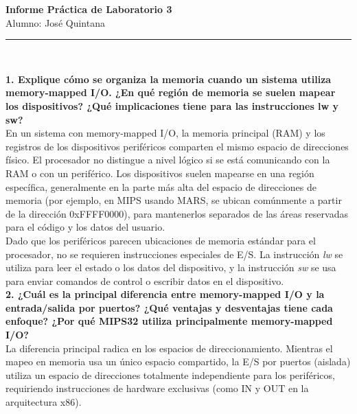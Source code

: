 \documentclass[]{article}
\begin{document}
	
	\begin{center}
		\Large{\textbf{Informe Práctica de Laboratorio 3}} \\
		\footnotesize{Alumno: José Quintana} \\
		\rule{1\linewidth}{0.5pt} \\ %
	\end{center}
	
	{\large \textbf{1. Explique cómo se organiza la memoria cuando un sistema utiliza memory-mapped I/O. ¿En qué región de memoria se suelen mapear los dispositivos? ¿Qué implicaciones tiene para las instrucciones lw y sw?}} \\
	
	En un sistema con memory-mapped I/O, la memoria principal (RAM) y los registros de los dispositivos periféricos comparten el mismo espacio de direcciones físico. El procesador no distingue a nivel lógico si se está comunicando con la RAM o con un periférico. Los dispositivos suelen mapearse en una región específica, generalmente en la parte más alta del espacio de direcciones de memoria (por ejemplo, en MIPS usando MARS, se ubican comúnmente a partir de la dirección 0xFFFF0000), para mantenerlos separados de las áreas reservadas para el código y los datos del usuario. \\
	
	Dado que los periféricos parecen ubicaciones de memoria estándar para el procesador, no se requieren instrucciones especiales de E/S. La instrucción \textit{lw} se utiliza para leer el estado o los datos del dispositivo, y la instrucción \textit{sw} se usa para enviar comandos de control o escribir datos en el dispositivo. \\
	
	{\large \textbf{2. ¿Cuál es la principal diferencia entre memory-mapped I/O y la entrada/salida por puertos? ¿Qué ventajas y desventajas tiene cada enfoque? ¿Por qué MIPS32 utiliza principalmente memory-mapped I/O?}} \\
	
	La diferencia principal radica en los espacios de direccionamiento. Mientras el mapeo en memoria usa un único espacio compartido, la E/S por puertos (aislada) utiliza un espacio de direcciones totalmente independiente para los periféricos, requiriendo instrucciones de hardware exclusivas (como IN y OUT en la arquitectura x86). \\
	
\end{document}
